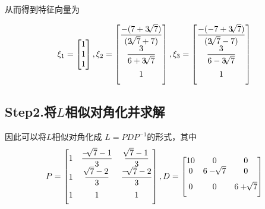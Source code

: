 从而得到特征向量为

\begin{equation}
    \displaystyle
\xi_1 = \begin{bmatrix}
    1\\
    1\\
    1\\
\end{bmatrix}
,
\xi_2 =\begin{bmatrix}
    \dfrac{-(7+3\sqrt[]{7})}{(2\sqrt[]{7} + 7)}\\
    \vspace{1.5ex}
    \dfrac{3}{6+3\sqrt[]{7}}\\
    \vspace{1.5ex}
    1\\
\end{bmatrix}
,
\xi_3 =\begin{bmatrix}
    \dfrac{-(-7+3\sqrt[]{7})}{(2\sqrt[]{7} - 7)}\\
    \vspace{1.5ex}
    \dfrac{3}{6-3\sqrt[]{7}}\\
    \vspace{1.5ex}
    1\\
\end{bmatrix}
\end{equation}

\subsection{Step2.将$L$相似对角化并求解}
因此可以将$L$相似对角化成 $L=PDP^{-1}$的形式，其中
\begin{equation}
P = \begin{bmatrix}
    1  & \dfrac{-\sqrt[]{7} - 1}{3} & \dfrac{\sqrt[]{7} - 1}{3} \\
    \vspace{1.5ex}
    1  & \dfrac{\sqrt[]{7} -2}{3}& \dfrac{-\sqrt[]{7} - 2}{3}\\
    \vspace{1.5ex}
    1  & 1                                          & 1\\
\end{bmatrix},
D = \begin{bmatrix}
    10 & 0 & 0\\
    \vspace{1.5ex}
    0  & 6-\sqrt[]{7} & 0\\
    \vspace{1.5ex}
    0 & 0 & 6 + \sqrt[]{7}\\
\end{bmatrix}
\end{equation}

